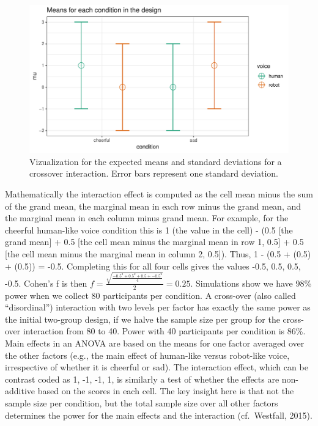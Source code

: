 \documentclass[,jou,floatsintext]{apa6}
\begin{document}
\begin{figure}
\centering
\includegraphics{0.1_Simulation_Based_Power_Analysis_For_Factorial_ANOVA_Designs_files/figure-latex/mean-plot-1.pdf}
\caption{\label{fig:mean-plot}Vizualization for the expected means and standard deviations for a crossover interaction. Error bars represent one standard deviation.}
\end{figure}

Mathematically the interaction effect is computed as the cell mean minus the sum of the grand mean, the marginal mean in each row minus the grand mean, and the marginal mean in each column minus grand mean. For example, for the cheerful human-like voice condition this is 1 (the value in the cell) - (0.5 {[}the grand mean{]} + 0.5 {[}the cell mean minus the marginal mean in row 1, 0.5{]} + 0.5 {[}the cell mean minus the marginal mean in column 2, 0.5{]}).
Thus, 1 - (0.5 + (0.5) + (0.5)) = -0.5.
Completing this for all four cells gives the values -0.5, 0.5, 0.5, -0.5.
Cohen's f is then \(f = \frac { \sqrt { \frac { -0.5^2 + 0.5^2 + 0.5 + -0.5^2 } { 4 } }}{ 2 } = 0.25\).
Simulations show we have 98\% power when we collect 80 participants per condition.
A cross-over (also called \enquote{disordinal}) interaction with two levels per factor has exactly the same power as the initial two-group design, if we halve the sample size per group for the cross-over interaction from 80 to 40.
Power with 40 participants per condition is 86\%.
Main effects in an ANOVA are based on the means for one factor averaged over the other factors (e.g., the main effect of human-like versus robot-like voice, irrespective of whether it is cheerful or sad).
The interaction effect, which can be contrast coded as 1, -1, -1, 1, is similarly a test of whether the effects are non-additive based on the scores in each cell.
The key insight here is that not the sample size per condition, but the total sample size over all other factors determines the power for the main effects and the interaction (cf.~Westfall, 2015).
\end{document}
